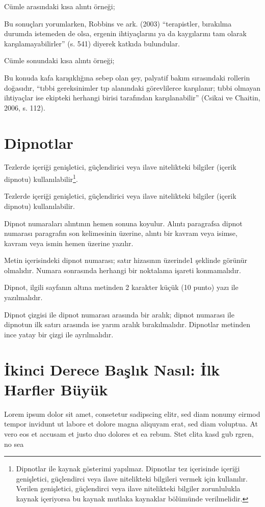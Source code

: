 Cümle arasındaki kısa alıntı örneği;

Bu sonuçları yorumlarken, Robbins ve ark. (2003) “terapistler, bırakılma durumda istemeden de olsa, ergenin ihtiyaçlarını ya da kaygılarını tam olarak karşılamayabilirler” (s. 541) diyerek katkıda bulundular.

Cümle sonundaki kısa alıntı örneği;

Bu konuda kafa karışıklığına sebep olan şey, palyatif bakım sırasındaki rollerin doğasıdır, “tıbbi gereksinimler tıp alanındaki görevlilerce karşılanır; tıbbi olmayan ihtiyaçlar ise ekipteki herhangi birisi tarafından karşılanabilir” (Csikai ve Chaitin, 2006, s. 112).

\section{Dipnotlar}
Tezlerde içeriği genişletici, güçlendirici veya ilave nitelikteki bilgiler (içerik dipnotu) kullanılabilir\footnote{Dipnotlar ile kaynak gösterimi yapılmaz. Dipnotlar tez içerisinde içeriği genişletici, güçlendirci veya ilave nitelikteki bilgileri vermek için kullanılır. Verilen genişletici, güçlendirci veya ilave nitelikteki bilgiler zorunlulukla kaynak içeriyorsa bu kaynak mutlaka kaynaklar bölümünde verilmelidir.}.

Tezlerde içeriği genişletici, güçlendirici veya ilave nitelikteki bilgiler (içerik dipnotu) kullanılabilir.

Dipnot numaraları alıntının hemen sonuna koyulur. Alıntı paragrafsa dipnot numarası paragrafın son kelimesinin üzerine, alıntı bir kavram veya isimse, kavram veya ismin hemen üzerine yazılır.

Metin içerisindeki dipnot numarası; satır hizasının üzerinde1 şeklinde görünür olmalıdır. Numara sonrasında herhangi bir noktalama işareti konmamalıdır.

Dipnot, ilgili sayfanın altına metinden 2 karakter küçük (10 punto) yazı ile yazılmalıdır.

Dipnot çizgisi ile dipnot numarası arasında bir aralık; dipnot numarası ile dipnotun ilk satırı arasında ise yarım aralık bırakılmalıdır. Dipnotlar metinden ince yatay bir çizgi ile ayrılmalıdır.

\section{İkinci Derece Başlık Nasıl: İlk Harfler Büyük}
Lorem ipsum dolor sit amet, consetetur sadipscing elitr, sed diam nonumy eirmod tempor invidunt ut labore et dolore magna aliquyam erat, sed diam voluptua. At vero eos et accusam et justo duo dolores et ea rebum. Stet clita kasd gub rgren, no sea

